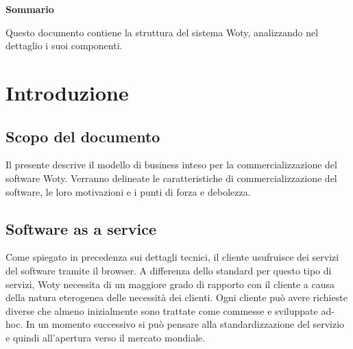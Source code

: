 
\newpage

\vspace*{0.5cm} %
\begin{center}

\textbf{{\huge{Sommario}}}

Questo documento contiene la struttura del sistema Woty, analizzando nel dettaglio i suoi componenti.

\vspace*{0.2cm} %

\end{center}






\newpage

\tableofcontents %

\let\cleardoublepage\clearpage %

\listoftables

\listoffigures




\newpage
\section{Introduzione}


\subsection{Scopo del documento}
Il presente descrive il modello di business inteso per la commercializzazione del software Woty. Verranno delineate le caratteristiche di commercializzazione del software, le loro motivazioni e i punti di forza e debolezza.


\subsection{Software as a service}
Come spiegato in precedenza sui dettagli tecnici, il cliente usufruisce dei servizi del software tramite il browser. A differenza dello standard per questo tipo di servizi, Woty necessita di un maggiore grado di rapporto con il cliente a causa della natura eterogenea delle necessità dei clienti. Ogni cliente può avere richieste diverse che almeno inizialmente sono trattate come commesse e sviluppate ad-hoc. In un momento successivo si può pensare alla standardizzazione del servizio e quindi all'apertura verso il mercato mondiale.

